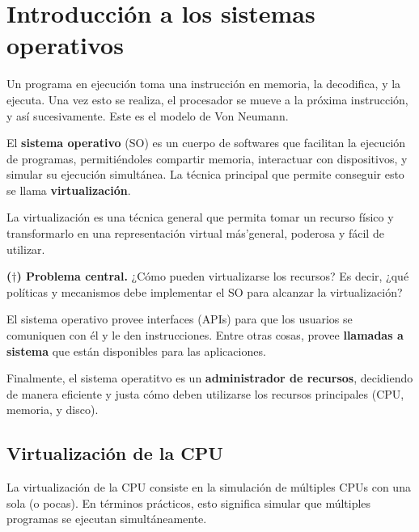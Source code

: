 \documentclass[12pt]{article}
\theoremstyle{definition}
\begin{document}
\section{Introducción a los sistemas operativos}

Un programa en ejecución toma una instrucción en memoria, la decodifica, y la
ejecuta. Una vez esto se realiza, el procesador se mueve a la próxima
instrucción, y así sucesivamente. Este es el modelo de Von Neumann. 

El \textbf{sistema operativo} (SO) es un cuerpo de softwares que facilitan la ejecución
de programas, permitiéndoles compartir memoria, interactuar con dispositivos, y
simular su ejecución simultánea. La técnica principal que permite conseguir esto
se llama \textbf{virtualización}. 

La virtualización es una técnica general que permita tomar un recurso físico y
transformarlo en una representación virtual más'general, poderosa y fácil de
utilizar.  

\begin{shaded}
    \textbf{($\dagger$) Problema central.} ¿Cómo pueden virtualizarse los recursos? Es
    decir, ¿qué políticas y mecanismos debe implementar el SO para alcanzar la
    virtualización?
\end{shaded}

El sistema operativo provee interfaces (APIs) para que los usuarios se
comuniquen con él y le den instrucciones. Entre otras cosas, provee 
\textbf{llamadas a sistema} que están disponibles para las aplicaciones. 

Finalmente, el sistema operatitvo es un \textbf{administrador de recursos}, 
decidiendo de manera eficiente y justa cómo deben utilizarse los recursos
principales (CPU, memoria, y disco).


\subsection{Virtualización de la CPU}

La virtualización de la CPU consiste en la simulación de múltiples CPUs con una
sola (o pocas). En términos prácticos, esto significa simular que múltiples
programas se ejecutan simultáneamente.
\end{document}
